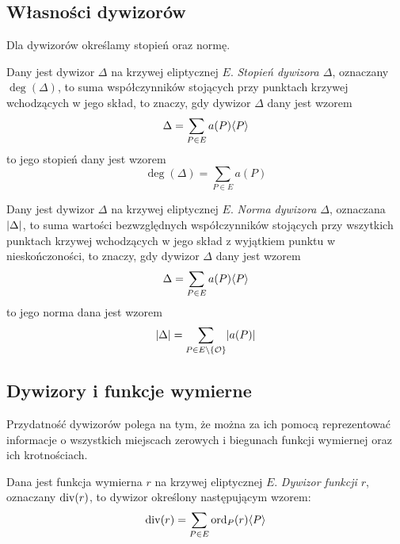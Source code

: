 \subsection*{Własności dywizorów}

Dla dywizorów określamy stopień oraz normę.

\begin{definition}
Dany jest dywizor $\Delta$ na krzywej eliptycznej $E$.
\emph{Stopień dywizora $\Delta$},
oznaczany $\deg(\Delta)$,
to suma współczynników
stojących przy punktach krzywej wchodzących w jego skład,
to znaczy, gdy dywizor $\Delta$ dany jest wzorem
\begin{equation*}
\Delta = \sum_{P \in E} a(P)\langle P\rangle
\end{equation*}
to jego stopień dany jest wzorem
\begin{equation*}
\deg(\Delta) = \sum_{P \in E} a(P)
\end{equation*}
\end{definition}

\begin{definition}
Dany jest dywizor $\Delta$ na krzywej eliptycznej $E$.
\emph{Norma dywizora $\Delta$},
oznaczana $\lvert\Delta\rvert$,
to suma wartości bezwzględnych współczynników
stojących przy wszytkich punktach krzywej wchodzących w jego skład
z wyjątkiem punktu w nieskończoności,
to znaczy, gdy dywizor $\Delta$ dany jest wzorem
\begin{equation*}
\Delta = \sum_{P \in E} a(P)\langle P\rangle
\end{equation*}
to jego norma dana jest wzorem
\begin{equation*}
\lvert\Delta\rvert = \sum_{P \in E \setminus \{\mathcal{O}\}} \lvert a(P)\rvert
\end{equation*}
\end{definition}

\subsection*{Dywizory i funkcje wymierne}

Przydatność dywizorów polega na tym, że można za ich pomocą
reprezentować informacje
o wszystkich miejscach zerowych i biegunach funkcji wymiernej
oraz ich krotnościach.

\begin{definition}
Dana jest funkcja wymierna $r$ na krzywej eliptycznej $E$.
\emph{Dywizor funkcji $r$},
oznaczany $\operatorname{div}(r)$,
to dywizor określony następującym wzorem:
\begin{equation*}
\operatorname{div}(r) = \sum_{P \in E} \operatorname{ord}_P(r)\langle P\rangle
\end{equation*}
\end{definition}

